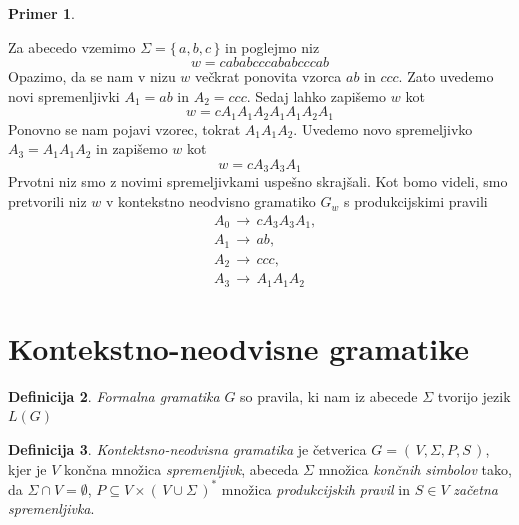 \documentclass{amsart}
\theoremstyle{definition} %
\newtheorem{definicija}{Definicija}[section]
\newtheorem{primer}[definicija]{Primer}
\theoremstyle{plain} %
\begin{document}
\begin{primer}\label{Kompresija}
    
    Za abecedo vzemimo $ \Sigma = \{\, a,b,c \,\} $ in poglejmo niz
    \[
        w = cababcccababcccab
    \]
    Opazimo, da se nam v nizu $ w $ večkrat ponovita vzorca $ ab $ in $ ccc $. Zato
    uvedemo novi spremenljivki $ A_1 = ab $ in $ A_2 = ccc $. Sedaj lahko zapišemo $ w $ kot
    \[
        w = cA_1A_1A_2A_1A_1A_2A_1
    \]
    Ponovno se nam pojavi vzorec, tokrat $ A_1A_1A_2 $. Uvedemo novo spremeljivko $ A_3 = A_1A_1A_2 $
    in zapišemo $ w $ kot
    \[
        w = cA_3A_3A_1
    \]
    Prvotni niz smo z novimi spremeljivkami uspešno skrajšali. Kot bomo videli, smo
    pretvorili niz $ w $ v kontekstno neodvisno gramatiko $ G_w $ s
    produkcijskimi pravili
    \begin{align*}
        & A_0 \, \rightarrow \, cA_3A_3A_1, \\
        & A_1 \, \rightarrow \, ab, \\
        & A_2 \, \rightarrow \, ccc, \\
        & A_3 \, \rightarrow \, A_1A_1A_2
    \end{align*}

\end{primer}

\section{Kontekstno-neodvisne gramatike}

\begin{definicija}

    \textit{Formalna gramatika} $ G $ so pravila, ki nam iz abecede $ \Sigma $ tvorijo jezik
    $ L(G) $

\end{definicija}

\begin{definicija}

    \textit{Kontektsno-neodvisna gramatika} je četverica $ G = (\, V, \Sigma, P, S \,) $, kjer je
    $ V $ končna množica \textit{spremenljivk}, abeceda $ \Sigma $ množica \textit{končnih simbolov} tako,
    da $ \Sigma \cap V = \emptyset $, $ P \subseteq V \times (\, V \cup \Sigma \,)^* $ množica 
    \textit{produkcijskih pravil} in $ S \in V $ \textit{začetna spremenljivka}.

\end{definicija}
\end{document}
